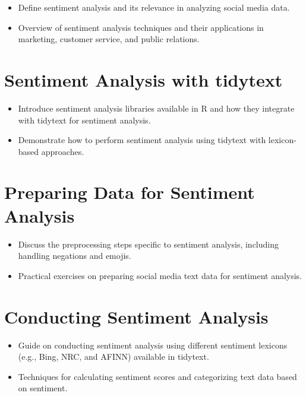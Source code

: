 \documentclass[
]{book}
\providecommand{\tightlist}{%
  \setlength{\itemsep}{0pt}\setlength{\parskip}{0pt}}
\begin{document}
\begin{itemize}
\tightlist
\item
  Define sentiment analysis and its relevance in analyzing social media data.
\item
  Overview of sentiment analysis techniques and their applications in marketing, customer service, and public relations.
\end{itemize}

\hypertarget{sentiment-analysis-with-tidytext}{%
\section{Sentiment Analysis with tidytext}\label{sentiment-analysis-with-tidytext}}

\begin{itemize}
\tightlist
\item
  Introduce sentiment analysis libraries available in R and how they integrate with tidytext for sentiment analysis.
\item
  Demonstrate how to perform sentiment analysis using tidytext with lexicon-based approaches.
\end{itemize}

\hypertarget{preparing-data-for-sentiment-analysis}{%
\section{Preparing Data for Sentiment Analysis}\label{preparing-data-for-sentiment-analysis}}

\begin{itemize}
\tightlist
\item
  Discuss the preprocessing steps specific to sentiment analysis, including handling negations and emojis.
\item
  Practical exercises on preparing social media text data for sentiment analysis.
\end{itemize}

\hypertarget{conducting-sentiment-analysis}{%
\section{Conducting Sentiment Analysis}\label{conducting-sentiment-analysis}}

\begin{itemize}
\tightlist
\item
  Guide on conducting sentiment analysis using different sentiment lexicons (e.g., Bing, NRC, and AFINN) available in tidytext.
\item
  Techniques for calculating sentiment scores and categorizing text data based on sentiment.
\end{itemize}
\end{document}
